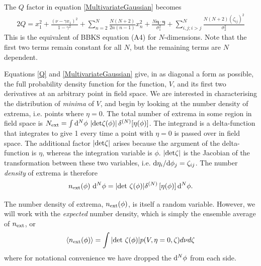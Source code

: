 \documentclass[12pt]{article}
\begin{document}
The $Q$ factor in equation \eqref{MultivariateGaussian} becomes
%
\begin{equation} \label{Q}
\begin{split}
2Q = x_1^2 + \frac{(\nu-\gamma x_1)^2}{1-\gamma^2}+\sum_{n=2}^N\frac{N(N+2)}{2n(n-1)}x_n^2 + \frac{N \pmb{\eta}\cdot \pmb{\eta}}{\sigma_1^2} + \sum_{i,j;i > j}^N\frac{N(N+2)(\zeta_{ij})^2}{\sigma_2^2}
\end{split}
\end{equation}
%
This is the equivalent of BBKS equation (A4) for $N$-dimensions. Note that the first two terms remain constant for all $N$, but the remaining terms are $N$ dependent.  

Equations \eqref{Q} and \eqref{MultivariateGaussian} give, in as diagonal a form as possible, the full probability density function for the function, $V$, and its first two derivatives at an arbitrary point in field space. We are interested in characterising the distribution of \emph{minima} of $V$, and begin by looking at the number density of extrema, i.e. points where $\eta=0$. The total number of extrema in some region in field space is $N_{\rm ext} = \int {\rm d}^N\phi \, \left| {\rm det}\zeta(\phi)\right|\delta^{(N)}[\eta(\phi)]$. The integrand is a delta-function that integrates to give 1 every time a point with $\eta=0$ is passed over in field space. The additional factor $\left| {\rm det \zeta} \right|$ arises because the argument of the delta-function is $\eta$, whereas the integration variable is $\phi$. $|{\rm det}\zeta|$ is the Jacobian of the transformation between these two variables, i.e. ${\rm d}\eta_i/{\rm d}\phi_j = \zeta_{ij}$. The number \emph{density} of extrema is therefore
%
\begin{equation}
n_{\rm ext}(\phi) \,\,{\rm d}^N \phi= |{\rm det}\,\, \zeta(\phi)| \delta^{(N)}\left[ \eta(\phi)\right] {\rm d}^N \phi.
\end{equation}

%
The number density of extrema, $n_{\rm ext}(\phi)$, is itself a random variable. However, we will work with the \emph{expected} number density, which is simply the ensemble average of $n_{\rm ext}$, or
% 
\begin{equation} \label{NumberDensity}
\langle n_{\rm ext}(\phi)  \rangle= \int |{\rm det}\,\, \zeta(\phi)| p(V,\eta=0,\zeta)d\nu d\zeta
\end{equation}
where for notational convenience we have dropped the ${\rm d}^N \phi$ from each side.
\end{document}
